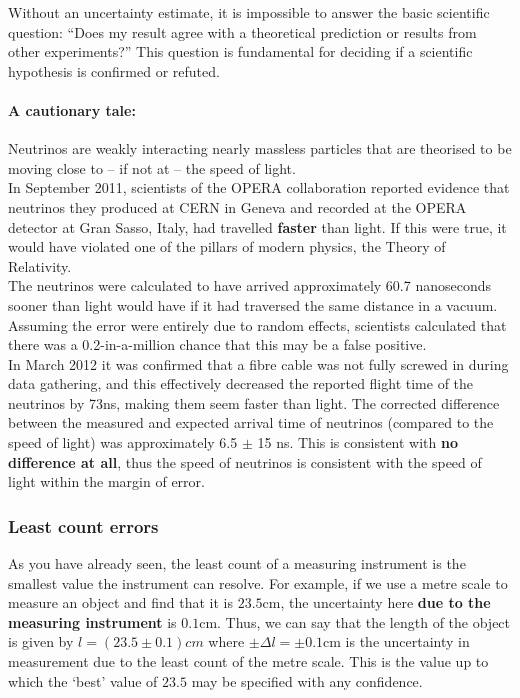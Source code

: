 Without an uncertainty estimate, it is impossible to answer the basic scientific question: ``Does my result agree with a theoretical prediction or results from other experiments?'' This question is fundamental for deciding if a scientific hypothesis is confirmed or refuted.

\begin{tip}
\paragraph{A cautionary tale:} Neutrinos are weakly interacting nearly massless particles that are theorised to be moving close to -- if not at -- the speed of light.\\

In September 2011, scientists of the OPERA collaboration reported evidence that neutrinos they produced at CERN in Geneva and recorded at the OPERA detector at Gran Sasso, Italy, had travelled \textbf{faster} than light. If this were true, it would have violated one of the pillars of modern physics, the Theory of Relativity.\\

The neutrinos were calculated to have arrived approximately 60.7 nanoseconds sooner than light would have if it had traversed the same distance in a vacuum. Assuming the error were entirely due to random effects, scientists calculated that there was a 0.2-in-a-million chance that this may be a false positive.\\

In March 2012 it was confirmed that a fibre cable was not fully screwed in during data gathering, and this effectively decreased the reported flight time of the neutrinos by 73ns, making them seem faster than light. The corrected difference between the measured and expected arrival time of neutrinos (compared to the speed of light) was approximately 6.5 $\pm$ 15 ns. This is consistent with \textbf{no difference at all}, thus the speed of neutrinos is consistent with the speed of light within the margin of error.
\end{tip}

\subsubsection{Least count errors}

As you have already seen, the least count of a measuring instrument is the smallest value the instrument can resolve. For example, if we use a metre scale to measure an object and find that it is $23.5$cm, the uncertainty here \textbf{due to the measuring instrument} is $0.1$cm. Thus, we can say that the length of the object is given by $l = (23.5 \pm 0.1) cm$ where $\pm \Delta l = \pm 0.1$cm is the uncertainty in measurement due to the least count of the metre scale. This is the value up to which the `best' value of $23.5$ may be specified with any confidence.

